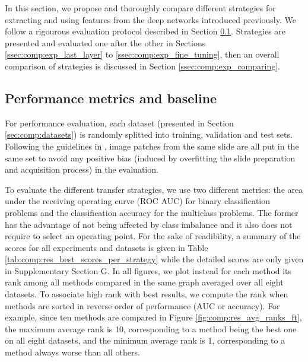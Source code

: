 In this section, we propose and thoroughly compare different strategies for extracting and using features from the deep networks introduced previously. We follow a rigourous evaluation protocol described in Section \ref{ssec:comp:protocol}. Strategies are presented and evaluated one after the other in Sections \ref{ssec:comp:exp_last_layer} to \ref{ssec:comp:exp_fine_tuning}, then an overall comparison of strategies is discussed in Section \ref{ssec:comp:exp_comparing}.



\subsection{Performance metrics and baseline}
\label{ssec:comp:protocol}
For performance evaluation, each dataset (presented in Section \ref{sec:comp:datasets}) is randomly splitted into training, validation and test sets. Following the guidelines in \parencite{maree2017need}, image patches from the same slide are all put in the same set to avoid any positive bias (induced by overfitting the slide preparation and acquisition process) in the evaluation. %

To evaluate the different transfer strategies, we use two different metrics: the area under the receiving operating curve (ROC AUC) for binary classification problems and the classification accuracy for the multiclass problems. The former has the advantage of not being affected by class imbalance and it also does not require to select an operating point. For the sake of readibility, a summary of the scores for all experiments and datasets is given in Table \ref{tab:comp:res_best_scores_per_strategy} while the detailed scores are only given in Supplementary Section G. In all figures, we plot instead for each method its rank among all methods compared in the same graph averaged over all eight datasets. To associate high rank with best results, we compute the rank when methods are sorted in reverse order of performance (AUC or accuracy). For example, since ten methods are compared in Figure \ref{fig:comp:res_avg_ranks_ft}, the maximum average rank is 10, corresponding to a method being the best one on all eight datasets, and the minimum average rank is 1, corresponding to a method always worse than all others.

